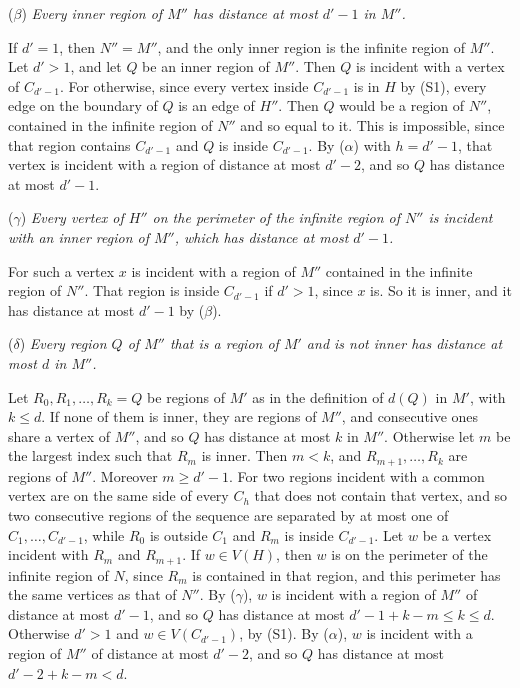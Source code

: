 {\hspace*{12pt}($\beta$) \textit{Every inner region of $M''$ has distance at most $d'-1$ in $M''$.}

If $d' = 1$, then $N'' = M''$, and the only inner region is the infinite region of $M''$. Let
$d' > 1$, and let $Q$ be an inner region of $M''$. Then $Q$ is incident with a vertex of $C_{d'-1}$.
For otherwise, since every vertex inside $C_{d'-1}$ is in $H$ by (S1), every edge on the boundary of $Q$
is an edge of $H''$. Then $Q$ would be a region of $N''$, contained in the infinite region of $N''$
and so equal to it. This is impossible, since that region contains $C_{d'-1}$ and $Q$ is inside
$C_{d'-1}$. By ($\alpha$) with $h = d'-1$, that vertex is incident with a region of distance at most
$d'-2$, and so $Q$ has distance at most $d'-1$.

\hspace*{12pt}($\gamma$) \textit{Every vertex of $H''$ on the perimeter of the infinite region of
$N''$ is incident with an inner region of $M''$, which has distance at most $d'-1$.}

For such a vertex $x$ is incident with a region of $M''$ contained in the infinite region of $N''$.
That region is inside $C_{d'-1}$ if $d' > 1$, since $x$ is. So it is inner, and it has distance at
most $d'-1$ by ($\beta$).

\hspace*{12pt}($\delta$) \textit{Every region $Q$ of $M''$ that is a region of $M'$ and is not inner
has distance at most $d$ in $M''$.}

Let $R_0, R_1, \dots, R_k = Q$ be regions of $M'$ as in the definition of $d(Q)$ in $M'$, with
$k \le d$. If none of them is inner, they are regions of $M''$, and consecutive ones share a vertex
of $M''$, and so $Q$ has distance at most $k$ in $M''$. Otherwise let $m$ be the largest index such
that $R_m$ is inner. Then $m < k$, and $R_{m+1}, \dots, R_k$ are regions of $M''$. Moreover
$m \ge d'-1$. For two regions incident with a common vertex are on the same side of every $C_h$ that
does not contain that vertex, and so two consecutive regions of the sequence are separated by at most
one of $C_1, \dots, C_{d'-1}$, while $R_0$ is outside $C_1$ and $R_m$ is inside $C_{d'-1}$. Let $w$
be a vertex incident with $R_m$ and $R_{m+1}$. If $w \in V(H)$, then $w$ is on the perimeter of the
infinite region of $N$, since $R_m$ is contained in that region, and this perimeter has the same
vertices as that of $N''$. By ($\gamma$), $w$ is incident
with a region of $M''$ of distance at most $d'-1$, and so $Q$ has distance at most
$d'-1+k-m \le k \le d$. Otherwise $d' > 1$ and $w \in V(C_{d'-1})$, by (S1). By ($\alpha$), $w$ is
incident with a region of $M''$ of distance at most $d'-2$, and so $Q$ has distance at most
$d'-2+k-m < d$.

}
